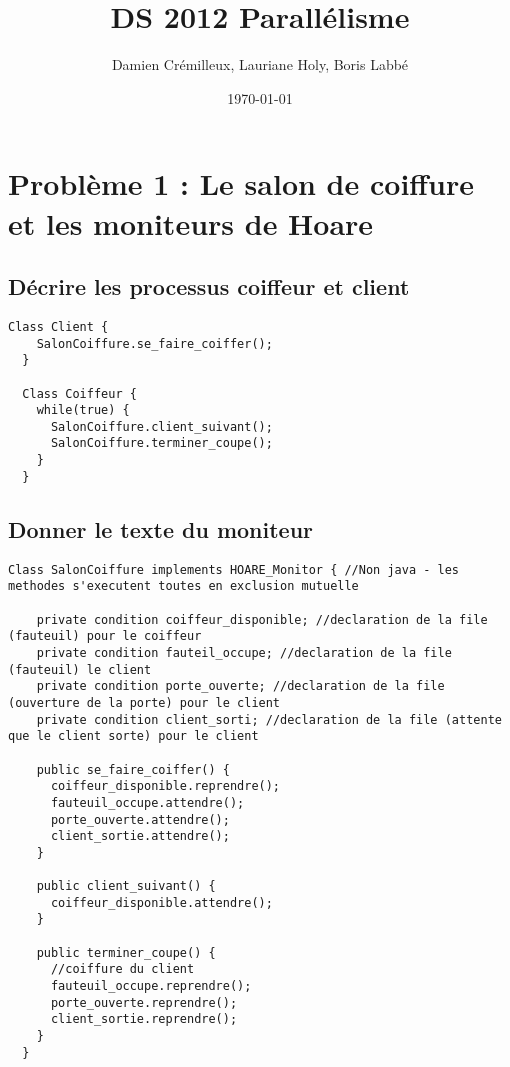 \documentclass[a4paper]{article}
\begin{document}
\title{DS 2012 Parallélisme}
\author{Damien Crémilleux, Lauriane Holy, Boris Labbé}
\date{\today}

\maketitle

\section{Problème 1 : Le salon de coiffure et les moniteurs de Hoare}

\subsection{Décrire les processus coiffeur et client}

\begin{lstlisting}[frame=single]
  Class Client {
    SalonCoiffure.se_faire_coiffer();
  }

  Class Coiffeur {
    while(true) {
      SalonCoiffure.client_suivant();
      SalonCoiffure.terminer_coupe();
    }
  }   
\end{lstlisting}

\subsection{Donner le texte du moniteur}
\begin{lstlisting}[frame=single, breaklines=true]
  Class SalonCoiffure implements HOARE_Monitor { //Non java - les methodes s'executent toutes en exclusion mutuelle
    
    private condition coiffeur_disponible; //declaration de la file (fauteuil) pour le coiffeur
    private condition fauteil_occupe; //declaration de la file (fauteuil) le client
    private condition porte_ouverte; //declaration de la file (ouverture de la porte) pour le client
    private condition client_sorti; //declaration de la file (attente que le client sorte) pour le client
    
    public se_faire_coiffer() {
      coiffeur_disponible.reprendre();
      fauteuil_occupe.attendre();
      porte_ouverte.attendre();
      client_sortie.attendre();
    }
    
    public client_suivant() {
      coiffeur_disponible.attendre();
    }
    
    public terminer_coupe() {
      //coiffure du client
      fauteuil_occupe.reprendre();
      porte_ouverte.reprendre();
      client_sortie.reprendre();
    }
  }
  
\end{lstlisting}
\end{document}
